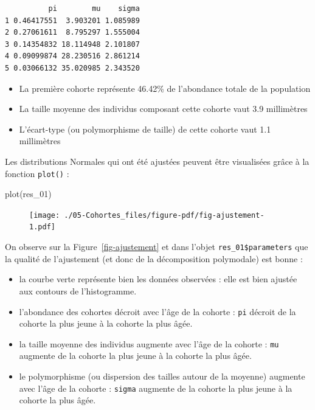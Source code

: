 \documentclass[
  a4paper,
  DIV=11,
  numbers=noendperiod,
  oneside]{scrreprt}
\newenvironment{Shaded}{}{}
\newcommand{\FunctionTok}[1]{\textcolor[rgb]{0.44,0.26,0.76}{#1}}
\newcommand{\NormalTok}[1]{\textcolor[rgb]{0.14,0.16,0.18}{#1}}
\providecommand{\tightlist}{%
  \setlength{\itemsep}{0pt}\setlength{\parskip}{0pt}}\usepackage{longtable,booktabs,array}
\begin{document}
\begin{verbatim}
          pi        mu    sigma
1 0.46417551  3.903201 1.085989
2 0.27061611  8.795297 1.555004
3 0.14354832 18.114948 2.101807
4 0.09099874 28.230516 2.861214
5 0.03066132 35.020985 2.343520
\end{verbatim}

\begin{itemize}
\tightlist
\item
  La première cohorte représente 46.42\% de l'abondance totale de la
  population
\item
  La taille moyenne des individus composant cette cohorte vaut 3.9
  millimètres
\item
  L'écart-type (ou polymorphisme de taille) de cette cohorte vaut 1.1
  millimètres
\end{itemize}

Les distributions Normales qui ont été ajustées peuvent être visualisées
grâce à la fonction \texttt{plot()} :

\begin{Shaded}
\begin{Highlighting}[]
\FunctionTok{plot}\NormalTok{(res\_01)}
\end{Highlighting}
\end{Shaded}

\begin{figure}


{\centering \texttt{[image: ./05-Cohortes\_files/figure-pdf/fig-ajustement-1.pdf]}

}

\end{figure}

On observe sur la Figure~\ref{fig-ajustement} et dans l'objet
\texttt{res\_01\$parameters} que la qualité de l'ajustement (et donc de
la décomposition polymodale) est bonne :

\begin{itemize}
\tightlist
\item
  la courbe verte représente bien les données observées : elle est bien
  ajustée aux contours de l'histogramme.
\item
  l'abondance des cohortes décroit avec l'âge de la cohorte :
  \texttt{pi} décroit de la cohorte la plus jeune à la cohorte la plus
  âgée.
\item
  la taille moyenne des individus augmente avec l'âge de la cohorte :
  \texttt{mu} augmente de la cohorte la plus jeune à la cohorte la plus
  âgée.
\item
  le polymorphisme (ou dispersion des tailles autour de la moyenne)
  augmente avec l'âge de la cohorte : \texttt{sigma} augmente de la
  cohorte la plus jeune à la cohorte la plus âgée.
\end{itemize}
\end{document}
